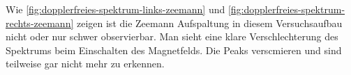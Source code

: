 \documentclass[../bericht.tex]{subfiles}
\begin{document}
Wie \cref{fig:dopplerfreies-spektrum-links-zeemann} und \cref{fig:dopplerfreies-spektrum-rechts-zeemann} zeigen ist die Zeemann Aufspaltung in diesem Versuchsaufbau nicht oder nur schwer observierbar. Man sieht eine klare Verschlechterung des Spektrums beim Einschalten des Magnetfelds. Die Peaks verscmieren und sind teilweise gar nicht mehr zu erkennen.
\end{document}
